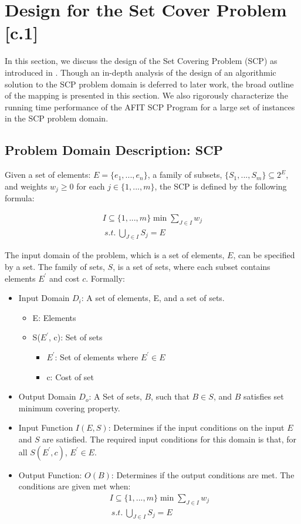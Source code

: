 \documentclass[12pt]{article}
\begin{document}
\section{Design for the Set Cover Problem [c.1]} \label{scn:design}

In this section, we discuss the design of the Set Covering Problem (SCP) as introduced in \cite{ClassNotes686}. Though an in-depth analysis of the design of an algorithmic solution to the SCP problem domain is deferred to later work, the broad outline of the mapping is presented in this section. We also rigorously characterize the running time performance of the AFIT SCP Program for a large set of instances in the SCP problem domain.

\subsection{Problem Domain Description: SCP}
Given a set of elements: $E=\{e_1,...,e_n\}$, a family of subsets, $\{S_1,...,S_m\}\subseteq 2^E$, and weights $w_j \geq 0$ for each $j\in\{1,...,m\}$, the SCP is defined by the following formula:

\begin{align*}
I \subseteq \{1,...,m\} \min \sum_{J \in I} w_j \\
\:s.t.\: \bigcup_{J \in I} S_j = E
\end{align*}


The input domain of the problem, which is a set of elements, $E$, can be specified by a set. The family of sets, $S$, is a set of sets, where each subset contains elements $E^\prime$ and cost $c$. Formally:

\begin{itemize}
	\item Input Domain $D_i$: A set of elements, E, and a set of sets. 
	\begin{itemize}
		\item E: Elements
		\item S($E^\prime$, c): Set of sets
		\begin{itemize}
			\item $E^\prime$: Set of elements where $E^\prime \in E$
			\item c: Cost of set
		\end{itemize}
	\end{itemize}	
	\item Output Domain $D_o$: A Set of sets, $B$, such that $B \in S$, and $B$ satisfies set minimum covering property. 
	
	\item Input Function $I(E, S)$: Determines if the input conditions on the input $E$ and $S$ are satisfied. The required input conditions for this domain is that, for all $S(E^\prime, c)$, $E^\prime \in E$.
	\item Output Function: $O(B)$: Determines if the output conditions are met. The conditions are given met when:
	\begin{align*}
	I \subseteq \{1,...,m\} \min \sum_{J \in I} w_j \\
	\:s.t.\: \bigcup_{J \in I} S_j = E
	\end{align*}
	
\end{itemize}
\end{document}
